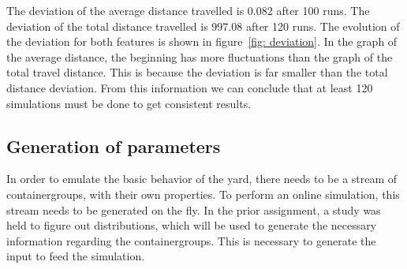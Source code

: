 \documentclass[]{article}
\begin{document}
The deviation of the average distance travelled is 0.082 after 100 runs. The
deviation of the total distance travelled is 997.08 after 120 runs. The
evolution of the deviation for both features is shown in figure~\ref{fig:
	deviation}. In the graph of the average distance, the beginning has more
fluctuations than the graph of the total travel distance. This is because the
deviation is far smaller than the total distance deviation. From this
information we can conclude that at least 120 simulations must be done to get
consistent results.

\subsection{Generation of parameters}
In order to emulate the basic behavior of the yard, there needs to be a stream
of containergroups, with their own properties. To perform an online simulation,
this stream needs to be generated on the fly. In the prior assignment, a study
was held to figure out distributions, which will be used to generate the
necessary information regarding the containergroups. This is necessary to
generate the input to feed the simulation.
\end{document}
